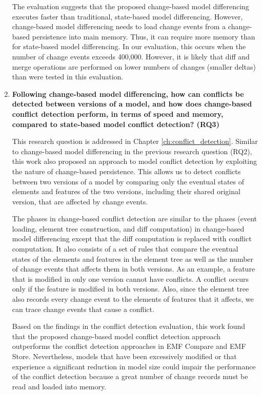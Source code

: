 \begin{enumerate}
  The evaluation suggests that the proposed change-based model differencing executes faster than traditional, state-based model differencing.
  However, change-based model differencing needs to load change events from a change-based persistence into main memory. Thus, it can require more memory than for state-based model differencing. In our evaluation, this occurs when the number of change events exceeds 400,000. However, it is likely that diff and merge operations are performed on lower numbers of changes (smaller deltas) than were tested in this evaluation.
  
  \item \textbf{Following change-based model differencing, how can conflicts be detected between versions of a model, and how does change-based conflict detection perform, in terms of speed and memory, compared to state-based model conflict detection? (RQ3)}
  
  This research question is addressed in Chapter \ref{ch:conflict_detection}. Similar to change-based model differencing in the previous research question (RQ2), this work also proposed an approach to model conflict detection by exploiting the nature of change-based persistence. This allows us to detect conflicts between two versions of a model by comparing only the eventual states of elements and features of the two versions, including their shared original version, that are affected by change events.
  
  The phases in change-based conflict detection are similar to the phases (event loading, element tree construction, and diff computation) in change-based model differencing except that the diff computation is replaced with conflict computation. It also consists of a set of rules that compare the eventual states of the elements and features in the element tree as well as the number of change events that affects them in both versions. As an example, a feature that is modified in only one version cannot have conflicts. A conflict occurs only if the feature is modified in both versions. Also, since the element tree also records every change event to the elements of features that it affects, we can trace change events that cause a conflict.
  
  Based on the findings in the conflict detection evaluation, this work found that the proposed change-based model conflict detection approach outperforms the conflict detection approaches in EMF Compare and EMF Store. Nevertheless, models that have been excessively modified or that experience a significant reduction in model size could impair the performance of the conflict detection because a great number of change records must be read and loaded into memory.
  
\end{enumerate}

